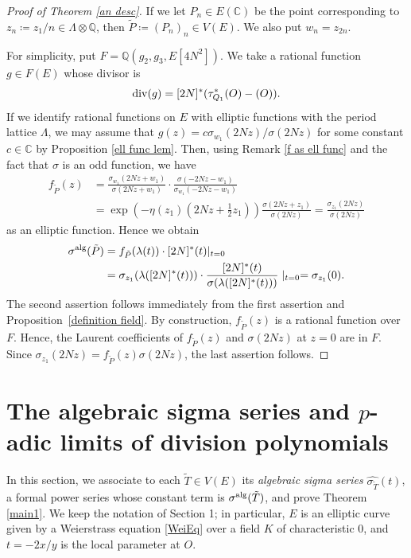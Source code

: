 \documentclass[11pt]{amsart}
\theoremstyle{definition}
\begin{document}
\begin{proof}[Proof of Theorem \ref{an desc}]
If we let $P_n \in E(\mathbb{C})$ be the point corresponding to $z_n \coloneqq z_1/n \in \Lambda \otimes \mathbb{Q}$, then $\tilde{P} \coloneqq (P_n)_n \in V(E)$. We also put $w_n=z_{2n}$.

For simplicity, put $F=\mathbb{Q}(g_2, g_3, E[4N^2])$. 
We take a rational function $g \in F(E)$ whose divisor is 
\[{\rm div}(g)=[2N]^{\ast}(\tau_{Q_1}^{\ast} (O)-(O)).\] If we identify rational functions on $E$ with elliptic functions with the period lattice $\Lambda$, we may assume that $g(z)=c\sigma_{w_1}(2Nz)/\sigma(2Nz)$ 
for some constant $c \in \mathbb{C}$ by Proposition \ref{ell func lem}. Then, using Remark \ref{f as ell func} and the fact that $\sigma$ is an odd function, we have
%
\begin{align*}
f_{\tilde{P}}(z)&=\frac{\sigma_{w_1}(2Nz+w_1)}{\sigma(2Nz+w_1)} \cdot \frac{\sigma(-2Nz-w_1)}{\sigma_{w_1}(-2Nz-w_1)} \\
&=\exp \left(-\eta(z_1)\left(2Nz+\frac{1}{2}z_1\right)\right) \frac{\sigma(2Nz+z_1)}{\sigma(2Nz)}
=\frac{\sigma_{z_1}(2Nz)}{\sigma(2Nz)}
\end{align*}
%
as an elliptic function. Hence we obtain
%
\begin{align*}
\sigma^{\rm alg}(\tilde{P})&=f_{\tilde{P}}(\lambda(t))\cdot [2N]^\ast(t) |_{t=0}\\
&=\sigma_{z_1}(\lambda([2N]^\ast(t)))\cdot \frac{[2N]^\ast(t)}{\sigma(\lambda([2N]^\ast(t)))} \mid_{t=0}=\sigma_{z_1}(0).
\end{align*}
%
The second assertion follows immediately from the first assertion and Proposition~\ref{definition field}.
By construction, $f_{\tilde{P}}(z)$ is a rational function over $F$.
Hence, the Laurent coefficients of $f_{\tilde{P}}(z)$ and $\sigma(2Nz)$ at $z=0$ are in $F$. Since $\sigma_{z_1}(2Nz)=f_{\tilde{P}}(z)\sigma(2Nz)$, the last assertion follows.
 \end{proof}

\section{The algebraic sigma series and $p$-adic limits of division polynomials}

In this section, we associate to each $\tilde{T} \in V(E)$ its
{\it algebraic sigma series} $\widehat{\sigma_{\tilde{T}}}(t)$, a formal
power series whose constant term is $\sigma^{\rm alg}(\tilde{T})$, and
prove Theorem \ref{main1}.
We keep the notation of Section 1; in particular, $E$ is an elliptic curve
given by a Weierstrass equation \eqref{WeiEq} over a field $K$ of
characteristic $0$, and $t=-2x/y$ is the local parameter at $O$.
\end{document}
